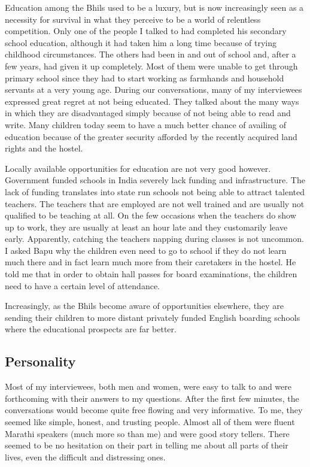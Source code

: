 \documentclass[report.tex]{subfiles}
\begin{document}
Education among the Bhils used to be a luxury, but is now increasingly seen as a necessity for survival in what they perceive to be a world of relentless competition. Only one of the people I talked to had completed his secondary school education, although it had taken him a long time because of trying childhood circumstances. The others had been in and out of school and, after a few years, had given it up completely. Most of them were unable to get through primary school since they had to start working as farmhands and household servants at a very young age. During our conversations, many of my interviewees expressed great regret at not being educated. They talked about the many ways in which they are disadvantaged simply because of not being able to read and write. Many children today seem to have a much better chance of availing of education because of the greater security afforded by the recently acquired land rights and the hostel.

Locally available opportunities for education are not very good however. Government funded schools in India severely lack funding and infrastructure. The lack of funding translates into state run schools not being able to attract talented teachers. The teachers that are employed are not well trained and are usually not qualified to be teaching at all. On the few occasions when the teachers do show up to work, they are usually at least an hour late and they customarily leave early. Apparently, catching the teachers napping during classes is not uncommon. I asked Bapu why the children even need to go to school if they do not learn much there and in fact learn much more from their caretakers in the hostel. He told me that in order to obtain hall passes for board examinations, the children need to have a certain level of attendance.

Increasingly, as the Bhils become aware of opportunities elsewhere, they are sending their children to more distant privately funded English boarding schools where the educational prospects are far better.

\subsection{Personality}

Most of my interviewees, both men and women, were easy to talk to and were forthcoming with their answers to my questions. After the first few minutes, the conversations would become quite free flowing and very informative. To me, they seemed like simple, honest, and trusting people. Almost all of them were fluent Marathi speakers (much more so than me) and were good story tellers. There seemed to be no hesitation on their part in telling me about all parts of their lives, even the difficult and distressing ones.
\end{document}
